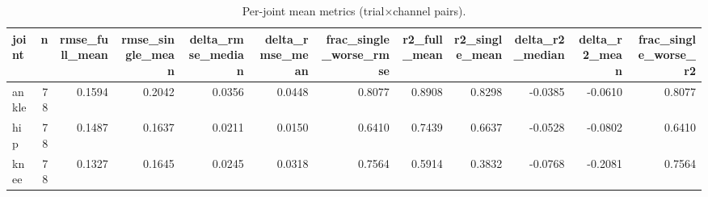 \begin{table}
\caption{Per-joint mean metrics (trial×channel pairs).}
\label{tab:table1_summary_by_joint}
\begin{tabular}{lrrrrrrrrrrr}
\toprule
joint & n & rmse_full_mean & rmse_single_mean & delta_rmse_median & delta_rmse_mean & frac_single_worse_rmse & r2_full_mean & r2_single_mean & delta_r2_median & delta_r2_mean & frac_single_worse_r2 \\
\midrule
ankle & 78 & 0.1594 & 0.2042 & 0.0356 & 0.0448 & 0.8077 & 0.8908 & 0.8298 & -0.0385 & -0.0610 & 0.8077 \\
hip & 78 & 0.1487 & 0.1637 & 0.0211 & 0.0150 & 0.6410 & 0.7439 & 0.6637 & -0.0528 & -0.0802 & 0.6410 \\
knee & 78 & 0.1327 & 0.1645 & 0.0245 & 0.0318 & 0.7564 & 0.5914 & 0.3832 & -0.0768 & -0.2081 & 0.7564 \\
\bottomrule
\end{tabular}
\end{table}
